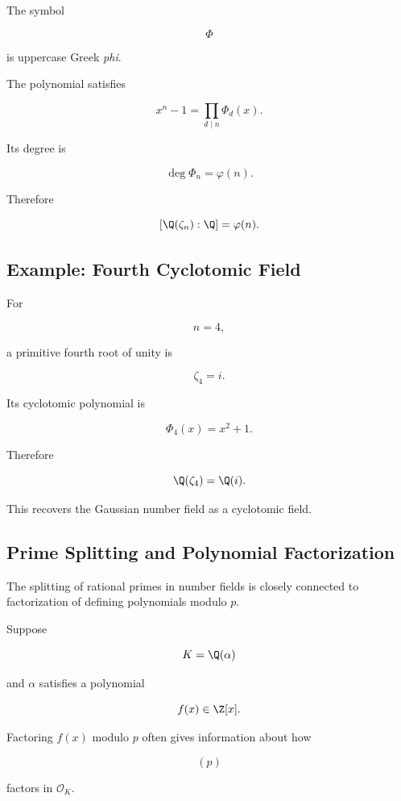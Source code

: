 The symbol

\[ \Phi \]

is uppercase Greek \emph{phi}.

The polynomial satisfies

\[ x^n-1=\prod_{d\mid n}\Phi_d(x). \]

Its degree is

\[ \boxed{\deg\Phi_n=\varphi(n).} \]

Therefore

\[ [\Q(\zeta_n):\Q]=\varphi(n). \]

\subsection{Example: Fourth Cyclotomic Field}
\label{subsec:fourth-cyclotomic-field}

For

\[ n=4, \]

a primitive fourth root of unity is

\[ \zeta_4=i. \]

Its cyclotomic polynomial is

\[ \Phi_4(x)=x^2+1. \]

Therefore

\[ \Q(\zeta_4)=\Q(i). \]

This recovers the Gaussian number field as a cyclotomic field.

\subsection{Prime Splitting and Polynomial Factorization}
\label{subsec:prime-splitting-polynomial}

The splitting of rational primes in number fields is closely connected to
factorization of defining polynomials modulo \(p\).

Suppose

\[ K=\Q(\alpha) \]

and \(\alpha\) satisfies a polynomial

\[ f(x)\in\Z[x]. \]

Factoring \(f(x)\) modulo \(p\) often gives information about how

\[ (p) \]

factors in \(\mathcal O_K\).


